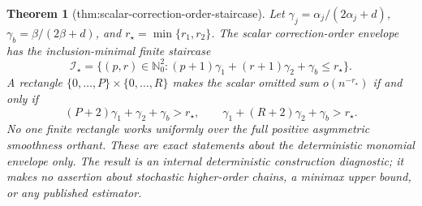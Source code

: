 \documentclass{article}
\newtheorem{theorem}{Theorem}
\begin{document}
\begin{theorem}[thm:scalar-correction-order-staircase]\label{thm:scalar-correction-order-staircase}
Let \(\gamma_j=\alpha_j/(2\alpha_j+d)\), \(\gamma_b=\beta/(2\beta+d)\), and \(r_\star=\min\{r_1,r_2\}\). The scalar correction-order envelope has the inclusion-minimal finite staircase
\[
\mathcal I_\star=\{(p,r)\in\mathbb N_0^2:(p+1)\gamma_1+(r+1)\gamma_2+\gamma_b\le r_\star\}.
\]
A rectangle \(\{0,\ldots,P\}\times\{0,\ldots,R\}\) makes the scalar omitted sum \(o(n^{-r_\star})\) if and only if
\[
(P+2)\gamma_1+\gamma_2+\gamma_b>r_\star,\qquad \gamma_1+(R+2)\gamma_2+\gamma_b>r_\star.
\]
No one finite rectangle works uniformly over the full positive asymmetric smoothness orthant. These are exact statements about the deterministic monomial envelope only. The result is an internal deterministic construction diagnostic; it makes no assertion about stochastic higher-order chains, a minimax upper bound, or any published estimator.
\end{theorem}
\end{document}
